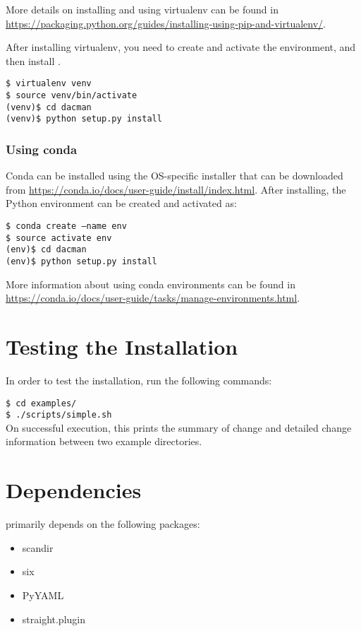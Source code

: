 More details on installing and using virtualenv can be found in
\url{https://packaging.python.org/guides/installing-using-pip-and-virtualenv/}.

After installing virtualenv, you need to create and activate the
environment, and then install \systemname.
 
\texttt{\$ virtualenv venv}\\
\texttt{\$ source venv/bin/activate}\\
\texttt{(venv)\$ cd dacman}\\
\texttt{(venv)\$ python setup.py install}

\subsubsection{Using conda}
Conda can be installed using the OS-specific installer that can be downloaded
from \url{https://conda.io/docs/user-guide/install/index.html}. After installing,
the Python environment can be created and activated as:

\texttt{\$ conda create --name env}\\
\texttt{\$ source activate env}\\
\texttt{(env)\$ cd dacman}\\
\texttt{(env)\$ python setup.py install}

More information about using conda environments can be found in
\url{https://conda.io/docs/user-guide/tasks/manage-environments.html}.

\section{Testing the Installation}
In order to test the \systemname installation, run the following commands:

\texttt{\$ cd examples/}\\
\texttt{\$ ./scripts/simple.sh}\\

On successful execution, this prints the summary of change and detailed
change information between two example directories.

\section{Dependencies}
\systemname primarily depends on the following packages:
\begin{itemize}
\item scandir
\item six
\item PyYAML
\item straight.plugin
\end{itemize}

